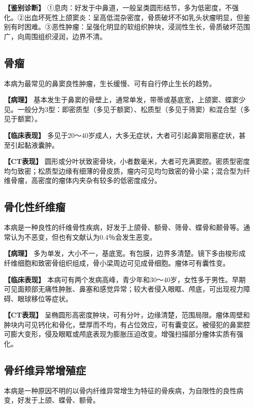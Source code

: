 \textbf{【鉴别诊断】}
①息肉：好发于中鼻道，一般呈类圆形结节，多为低密度，不强化。②出血坏死性上颌窦炎：呈高低混杂密度，骨质破坏不如乳头状瘤明显，但鉴别有时困难。③恶性肿瘤：呈强化明显的软组织肿块，浸润性生长，骨质破坏范围广，向周围组织浸润，边界不清。

\subsection{骨瘤}

本病为最常见的鼻窦良性肿瘤，生长缓慢、可有自行停止生长的趋势。

\textbf{【病理】}
基本发生于鼻窦的骨壁上，通常单发，带蒂或基底宽，上颌窦、蝶窦少见。一般分为3型：即密质型（多见于额窦）、松质型（多见于筛窦）和混合型（多见于额窦）。

\textbf{【临床表现】}
多见于20～40岁成人，大多无症状，大者可引起鼻窦阻塞症状，甚至引起黏液囊肿。

\textbf{【CT表现】}
圆形或分叶状致密骨块，小者数毫米，大者可充满窦腔。密质型密度均匀致密；松质型边缘有细薄的骨皮质，瘤内可见均匀致密的骨小梁；混合型为纤维骨瘤，高密度的瘤体内夹杂有较多的低密度成分。

\subsection{骨化性纤维瘤}

本病是一种良性的纤维骨性疾病，好发于上颌骨、额骨、筛骨、蝶骨和颞骨等。通常认为不恶变，但也有文献认为0.4％会发生恶变。

\textbf{【病理】}
多为单发，大小不一，基底宽。有包膜，边界多清楚。镜下多由梭形成纤维细胞和致密骨组织组成，骨小梁周边可见成骨细胞。瘤体可有囊性变。

\textbf{【临床表现】}
本病可有两个发病高峰，青少年和30～40岁，女性多于男性。早期可见面颊部无痛性肿胀、鼻塞和感觉异常；较大者侵入眼眶、颅底，可出现视力障碍、眼球移位等症状。

\textbf{【CT表现】}
呈椭圆形高密度肿块，可有分叶，边缘清楚，范围局限。瘤体周壁和肿块内可见钙化和骨化，壁厚而不均，有占位效应，可有囊变区。被侵犯的鼻窦腔可膨大变形，侵及眼眶或颅底表现为膨胀压迫改变。增强扫描部分瘤体实质有强化。

\subsection{骨纤维异常增殖症}

本病是一种原因不明的以骨内纤维异常增生为特征的骨疾病，为自限性的良性病变，好发于上颌、蝶骨、额骨。

